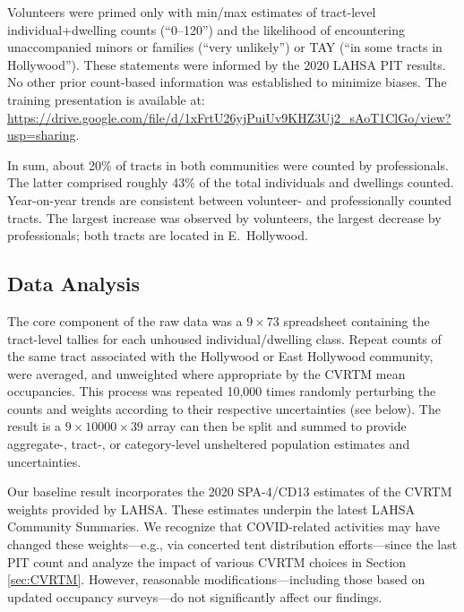 \documentclass[11pt,twocolumn]{article}
\begin{document}
Volunteers were primed only with min/max estimates of tract-level individual+dwelling counts 
(``0--120'') and the likelihood of encountering unaccompanied minors or families (``very unlikely'')
or TAY (``in some tracts in Hollywood''). These statements were informed by the 2020 LAHSA PIT 
results. No other prior count-based information was established to minimize biases. The training 
presentation is available at: \url{https://drive.google.com/file/d/1xFrtU26yjPuiUv9KHZ3Uj2_sAoT1ClGo/view?usp=sharing}.

In sum, about 20\% of tracts in both communities were counted by professionals. The latter comprised
roughly 43\% of the total individuals and dwellings counted. Year-on-year trends are consistent between
volunteer- and professionally counted tracts. The largest increase was observed by volunteers, the largest
decrease by professionals; both tracts are located in E.~Hollywood.

\subsection{Data Analysis}
\label{sec:analysis}

The core component of the raw data was a $9\times73$ spreadsheet containing the
tract-level tallies for each unhoused individual/dwelling class. Repeat counts of the same
tract associated with the Hollywood or East Hollywood community, were averaged, and
unweighted where appropriate by the CVRTM mean occupancies. This process was repeated 
10,000 times randomly perturbing the counts and weights according to their respective 
uncertainties (see below). The result is a $9\times10000\times39$ array can then 
be split and summed to provide aggregate-, tract-, or category-level unsheltered
population estimates and uncertainties.

Our baseline result incorporates the 2020 SPA-4/CD13 estimates of the CVRTM weights provided
by LAHSA. These estimates underpin the latest LAHSA Community Summaries. We recognize 
that COVID-related activities may have changed these weights---e.g., via concerted tent distribution
efforts---since the last PIT count and analyze the impact of various CVRTM choices in 
Section \ref{sec:CVRTM}. However, reasonable modifications---including those based on updated
occupancy surveys---do not significantly affect our findings.

\end{document}
